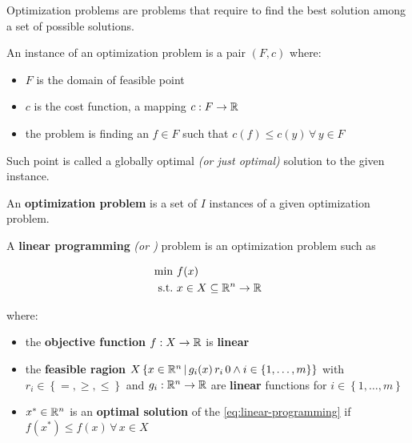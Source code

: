 \documentclass[english]{article}
\begin{document}
Optimization problems are problems that require to find the best solution among a set of possible solutions.

\begin{definition}
  An instance of an optimization problem is a pair \(\left( F, c \right)\) where:
  \begin{itemize}
    \item \(F\) is the domain of feasible point
    \item \(c\) is the cost function, a mapping \(c :  F \rightarrow \mathbb{R}\)
    \item the problem is finding an \(f \in F\) such that \(c\left( f \right) \leq c\left( y \right) \, \forall \, y \in F\)
  \end{itemize}
  Such point is called a globally optimal \textit{(or just optimal)} solution to the given instance.
\end{definition}

\bigskip
\begin{definition}
  An \textbf{optimization problem} is a set of \(I\) instances of a given optimization problem.
\end{definition}

\bigskip
\begin{definition}
  A \textbf{linear programming} \textit{(or \LP)} problem is an optimization problem such as

  \begin{gather}
    \begin{aligned}
      \min \         & f(x)                                  \\
      \text{s.t.} \  & x \in X \subseteq \mathbb{R}^n \rightarrow \mathbb{R}
    \end{aligned}
    \label{eq:linear-programming}
  \end{gather}

  where:

  \begin{itemize}
    \item the \textbf{objective function} \(f: X \rightarrow \mathbb{R}\) is \textbf{linear}
    \item the \textbf{feasible ragion} \(X \left\{ x \in \mathbb{R}^n \, | \, g_i(x) \, r_i \, 0 \land i \in \left\{ 1, \ldots, m \right\}\right\}\) with \(r_i \in \left\{ =, \geq, \leq \right\}\) and \(g_i: \mathbb{R}^n \rightarrow \mathbb{R}\) are \textbf{linear} functions for \(i \in \left\{ 1, \ldots, m \right\}\)
    \item \(x^\ast \in \mathbb{R}^n\) is an \textbf{optimal solution} of the \LP \ref{eq:linear-programming} if \(f(x^\ast) \leq f(x) \, \forall \, x \in X\)
  \end{itemize}
\end{definition}
\end{document}
